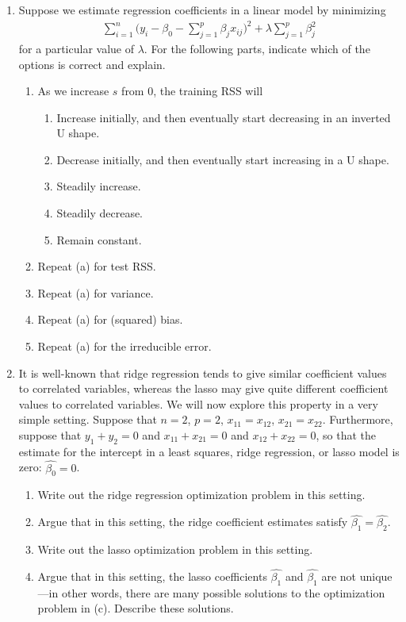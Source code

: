 \documentclass[11pt, a4paper]{article}
\begin{document}
\begin{enumerate}
        \item Suppose we estimate regression coefficients in a linear model by minimizing
        \begin{gather*}
            \sum_{i=1}^{n}\bigg( y_{i} - \beta_{0} - \sum_{j=1}^{p}\beta_{j}x_{ij} \bigg)^{2} + \lambda \sum_{j=1}^{p}\beta_{j}^{2}
        \end{gather*}
        for a particular value of $\lambda$. For the following parts, indicate which of the options is correct and explain.
        \begin{enumerate}
            \item As we increase $s$ from 0, the training RSS will
            \begin{enumerate}
                \item Increase initially, and then eventually start decreasing in an inverted U shape.
                \item Decrease initially, and then eventually start increasing in a U shape.
                \item Steadily increase.
                \item Steadily decrease.
                \item Remain constant.
            \end{enumerate}
            \item Repeat (a) for test RSS.
            \item Repeat (a) for variance.
            \item Repeat (a) for (squared) bias.
            \item Repeat (a) for the irreducible error.
        \end{enumerate}

        \item It is well-known that ridge regression tends to give similar coefficient values to correlated variables, whereas the lasso may give quite different coefficient values to correlated variables. We will now explore this property in a very simple setting.\newline
        Suppose that $n = 2$, $p = 2$, $x_{11} = x_{12}$, $x_{21} = x_{22}$. Furthermore, suppose that $y_{1} +y_{2} = 0$ and $x_{11} +x_{21} = 0$ and $x_{12} +x_{22} = 0$, so that the estimate for the intercept in a least squares, ridge regression, or lasso model is zero: $\hat{\beta_{0}} = 0$.
        \begin{enumerate}
        \item Write out the ridge regression optimization problem in this setting.
        \item Argue that in this setting, the ridge coefficient estimates satisfy $\hat{\beta_{1}} = \hat{\beta_{2}}$.
        \item Write out the lasso optimization problem in this setting.
        \item Argue that in this setting, the lasso coefficients $\hat{\beta_{1}}$ and $\hat{\beta_{1}}$ are not unique—in other words, there are many possible solutions to the optimization problem in (c). Describe these solutions.
        \end{enumerate}
        

\end{enumerate}
\end{document}
